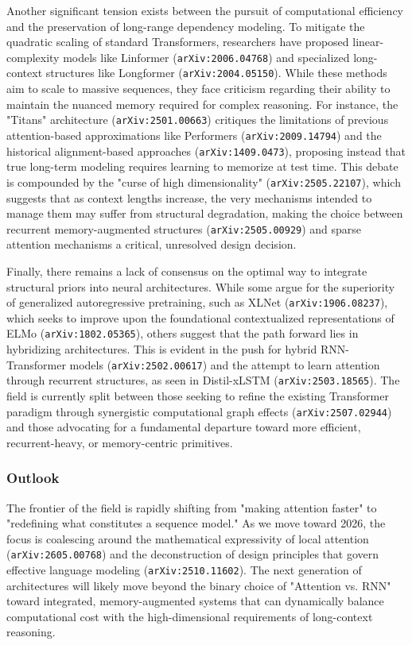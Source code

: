 \documentclass[11pt]{article}
\begin{document}
Another significant tension exists between the pursuit of computational efficiency and the preservation of long-range dependency modeling. To mitigate the quadratic scaling of standard Transformers, researchers have proposed linear-complexity models like Linformer (\texttt{arXiv:2006.04768}) and specialized long-context structures like Longformer (\texttt{arXiv:2004.05150}). While these methods aim to scale to massive sequences, they face criticism regarding their ability to maintain the nuanced memory required for complex reasoning. For instance, the "Titans" architecture (\texttt{arXiv:2501.00663}) critiques the limitations of previous attention-based approximations like Performers (\texttt{arXiv:2009.14794}) and the historical alignment-based approaches (\texttt{arXiv:1409.0473}), proposing instead that true long-term modeling requires learning to memorize at test time. This debate is compounded by the "curse of high dimensionality" (\texttt{arXiv:2505.22107}), which suggests that as context lengths increase, the very mechanisms intended to manage them may suffer from structural degradation, making the choice between recurrent memory-augmented structures (\texttt{arXiv:2505.00929}) and sparse attention mechanisms a critical, unresolved design decision.

Finally, there remains a lack of consensus on the optimal way to integrate structural priors into neural architectures. While some argue for the superiority of generalized autoregressive pretraining, such as XLNet (\texttt{arXiv:1906.08237}), which seeks to improve upon the foundational contextualized representations of ELMo (\texttt{arXiv:1802.05365}), others suggest that the path forward lies in hybridizing architectures. This is evident in the push for hybrid RNN-Transformer models (\texttt{arXiv:2502.00617}) and the attempt to learn attention through recurrent structures, as seen in Distil-xLSTM (\texttt{arXiv:2503.18565}). The field is currently split between those seeking to refine the existing Transformer paradigm through synergistic computational graph effects (\texttt{arXiv:2507.02944}) and those advocating for a fundamental departure toward more efficient, recurrent-heavy, or memory-centric primitives.

\subsubsection{Outlook}

The frontier of the field is rapidly shifting from "making attention faster" to "redefining what constitutes a sequence model." As we move toward 2026, the focus is coalescing around the mathematical expressivity of local attention (\texttt{arXiv:2605.00768}) and the deconstruction of design principles that govern effective language modeling (\texttt{arXiv:2510.11602}). The next generation of architectures will likely move beyond the binary choice of "Attention vs. RNN" toward integrated, memory-augmented systems that can dynamically balance computational cost with the high-dimensional requirements of long-context reasoning.
\end{document}
